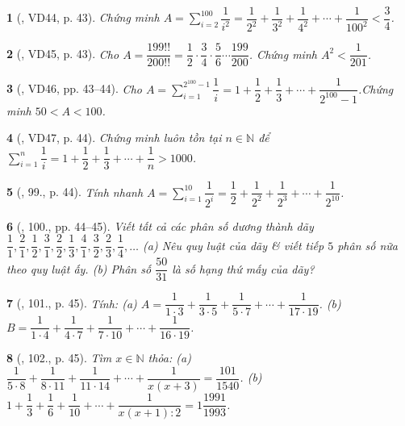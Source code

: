 \documentclass{article}
\newtheorem{baitoan}{}
\begin{document}
\begin{baitoan}[\cite{Binh_Toan_6_tap_2}, VD44, p. 43]
	Chứng minh $A = \sum_{i=2}^{100} \dfrac{1}{i^2} = \dfrac{1}{2^2} + \dfrac{1}{3^2} + \dfrac{1}{4^2} + \cdots + \dfrac{1}{100^2} < \dfrac{3}{4}$.
\end{baitoan}

\begin{baitoan}[\cite{Binh_Toan_6_tap_2}, VD45, p. 43]
	Cho $A = \dfrac{199!!}{200!!} = \dfrac{1}{2}\cdot\dfrac{3}{4}\cdot\dfrac{5}{6}\cdots\dfrac{199}{200}$. Chứng minh $A^2 < \dfrac{1}{201}$.
\end{baitoan}

\begin{baitoan}[\cite{Binh_Toan_6_tap_2}, VD46, pp. 43--44]
	Cho $A = \sum_{i=1}^{2^{100} - 1} \dfrac{1}{i} = 1 + \dfrac{1}{2} + \dfrac{1}{3} + \cdots + \dfrac{1}{2^{100} - 1}$.Chứng minh $50 < A < 100$.
\end{baitoan}

\begin{baitoan}[\cite{Binh_Toan_6_tap_2}, VD47, p. 44]
	Chứng minh luôn tồn tại $n\in\mathbb{N}$ để $\sum_{i=1}^n \dfrac{1}{i} = 1 + \dfrac{1}{2} + \dfrac{1}{3} + \cdots + \dfrac{1}{n} > 1000$.
\end{baitoan}

\begin{baitoan}[\cite{Binh_Toan_6_tap_2}, 99., p. 44]
	Tính nhanh $A = \sum_{i=1}^{10} \dfrac{1}{2^i} = \dfrac{1}{2} + \dfrac{1}{2^2} + \dfrac{1}{2^3} + \cdots + \dfrac{1}{2^10}$.
\end{baitoan}

\begin{baitoan}[\cite{Binh_Toan_6_tap_2}, 100., pp. 44--45]
	Viết tất cả các phân số dương thành dãy $\dfrac{1}{1},\dfrac{2}{1},\dfrac{1}{2},\dfrac{3}{1},\dfrac{2}{2},\dfrac{1}{3},\dfrac{4}{1},\dfrac{3}{2},\dfrac{2}{3},\dfrac{1}{4},\ldots$ (a) Nêu quy luật của dãy \& viết tiếp $5$ phân số nữa theo quy luật ấy. (b) Phân số $\dfrac{50}{31}$ là số hạng thứ mấy của dãy?
\end{baitoan}

\begin{baitoan}[\cite{Binh_Toan_6_tap_2}, 101., p. 45]
	Tính: (a) $A = \dfrac{1}{1\cdot3} + \dfrac{1}{3\cdot5} + \dfrac{1}{5\cdot7} + \cdots + \dfrac{1}{17\cdot19}$. (b) $B = \dfrac{1}{1\cdot4} + \dfrac{1}{4\cdot7} + \dfrac{1}{7\cdot10} + \cdots + \dfrac{1}{16\cdot19}$.
\end{baitoan}

\begin{baitoan}[\cite{Binh_Toan_6_tap_2}, 102., p. 45]
	Tìm $x\in\mathbb{N}$ thỏa: (a) $\dfrac{1}{5\cdot8} + \dfrac{1}{8\cdot11} + \dfrac{1}{11\cdot14} + \cdots + \dfrac{1}{x(x + 3)} = \dfrac{101}{1540}$. (b) $1 + \dfrac{1}{3} + \dfrac{1}{6} + \dfrac{1}{10} + \cdots + \dfrac{1}{x(x + 1):2} = 1\dfrac{1991}{1993}$.
\end{baitoan}
\end{document}
